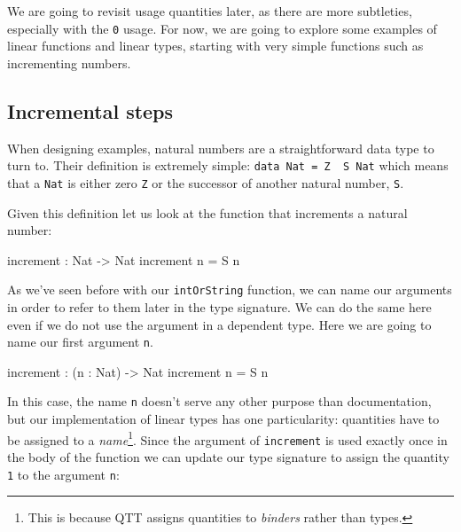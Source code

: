\documentclass[
]{article}
\newenvironment{Shaded}{}{}
\newcommand{\DataTypeTok}[1]{\textcolor[rgb]{0.56,0.13,0.00}{#1}}
\newcommand{\NormalTok}[1]{#1}
\newcommand{\OperatorTok}[1]{\textcolor[rgb]{0.40,0.40,0.40}{#1}}
\newcommand{\OtherTok}[1]{\textcolor[rgb]{0.00,0.44,0.13}{#1}}
\begin{document}
We are going to revisit usage quantities later, as there are more
subtleties, especially with the \texttt{0} usage. For now, we are going
to explore some examples of linear functions and linear types, starting
with very simple functions such as incrementing numbers.

\hypertarget{incremental-steps}{%
\subsection{Incremental steps}\label{incremental-steps}}

When designing examples, natural numbers are a straightforward data type
to turn to. Their definition is extremely simple:
\texttt{data\ Nat\ =\ Z\ \textbar{}\ S\ Nat} which means that a
\texttt{Nat} is either zero \texttt{Z} or the successor of another
natural number, \texttt{S}.

Given this definition let us look at the function that increments a
natural number:

\begin{Shaded}
\begin{Highlighting}[]
\NormalTok{increment }\OperatorTok{:} \DataTypeTok{Nat} \OtherTok{{-}\textgreater{}} \DataTypeTok{Nat}
\NormalTok{increment n }\OtherTok{=} \DataTypeTok{S}\NormalTok{ n}
\end{Highlighting}
\end{Shaded}

As we've seen before with our \texttt{intOrString} function, we can name
our arguments in order to refer to them later in the type signature. We
can do the same here even if we do not use the argument in a dependent
type. Here we are going to name our first argument \texttt{n}.

\begin{Shaded}
\begin{Highlighting}[]
\NormalTok{increment }\OperatorTok{:}\NormalTok{ (n }\OperatorTok{:} \DataTypeTok{Nat}\NormalTok{) }\OtherTok{{-}\textgreater{}} \DataTypeTok{Nat}
\NormalTok{increment n }\OtherTok{=} \DataTypeTok{S}\NormalTok{ n}
\end{Highlighting}
\end{Shaded}

In this case, the name \texttt{n} doesn't serve any other purpose than
documentation, but our implementation of linear types has one
particularity: quantities have to be assigned to a
\emph{name}\footnote{This is because QTT assigns quantities to
  \emph{binders} rather than types.}. Since the argument of
\texttt{increment} is used exactly once in the body of the function we
can update our type signature to assign the quantity \texttt{1} to the
argument \texttt{n}:
\end{document}
